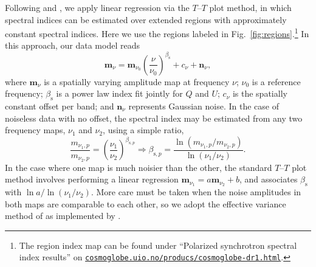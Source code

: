 \documentclass[twocolumn]{../../common/aa}
\newcommand{\Cosmoglobe}{\textsc{Cosmoglobe}}
\begin{document}
Following \citet{fuskeland2014} and \citet{fuskeland:2019}, we apply linear regression via the $T$--$T$ plot method, in which spectral indices can be estimated over extended regions with approximately constant spectral indices. Here we use the regions labeled in Fig.~\ref{fig:regions}.\footnote{The region index map can be found under ``Polarized synchrotron spectral index results'' on \href{https://www.cosmoglobe.uio.no/products/cosmoglobe-dr1.html}{\texttt{cosmoglobe.uio.no/producs/cosmoglobe-dr1.html}}.}
 In this approach, our data model reads
\begin{equation}
	\boldsymbol m_\nu = \boldsymbol m_{\nu_0}\left(\frac\nu{\nu_0}\right)^{\beta_\mathrm s}+c_\nu+\boldsymbol n_\nu ,
\end{equation}
where $\boldsymbol m_\nu$ is a spatially varying amplitude map at frequency $\nu$; $\nu_0$ is a reference frequency; $\beta_\mathrm s$ is a power law index fit jointly for $Q$ and $U$; $c_\nu$ is the spatially constant offset per band; and $\boldsymbol n_\nu$ represents Gaussian noise. In the case of noiseless data with no offset, the spectral index may be estimated from any two frequency maps, $\nu_1$ and $\nu_2$, using a simple ratio,
\begin{equation}
	\frac{m_{\nu_1,p}}{m_{\nu_2,p}}
	=\left(\frac{\nu_1}{\nu_2}\right)^{\beta_{\mathrm s,p}}
	\Rightarrow
	\beta_{\mathrm s,p}=\frac{\ln(m_{\nu_1,p}/m_{\nu_2,p})}{\ln(\nu_1/\nu_2)}.
\end{equation}
In the case where one map is much noisier than the other, the standard $T$--$T$ plot method involves performing  a linear regression $\boldsymbol m_{\nu_1}=a\boldsymbol m_{\nu_2}+b$, and associates $\beta_\mathrm s$ with $\ln a/\ln(\nu_1/\nu_2)$. More care must be taken when the noise amplitudes in both maps are comparable to each other, so we adopt the effective variance method of \citet{orear1982} as implemented by \citet{fuskeland2014}.






%
\end{document}
